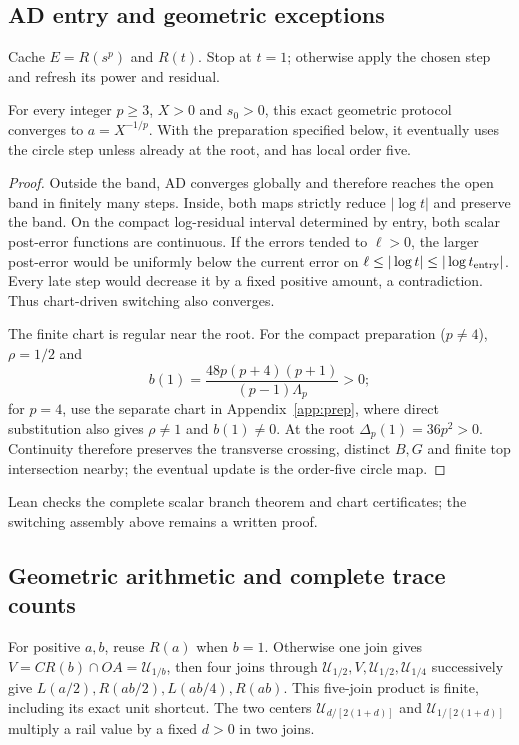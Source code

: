 \documentclass[11pt,a4paper]{article}
\newcommand{\hub}[1]{\mathcal U_{#1}}
\begin{document}
\subsection{AD entry and geometric exceptions}
Cache $E=R(s^p)$ and $R(t)$. Stop at $t=1$; otherwise apply the chosen step and refresh its power and residual.

\begin{proposition}\label{thm:entry}
For every integer $p\ge3$, $X>0$ and $s_0>0$, this exact geometric protocol converges to $a=X^{-1/p}$. With the preparation specified below, it eventually uses the circle step unless already at the root, and has local order five.
\end{proposition}
\begin{proof}
Outside the band, AD converges globally and therefore reaches the open band in finitely many steps. Inside, both maps strictly reduce $|\log t|$ and preserve the band. On the compact log-residual interval determined by entry, both scalar post-error functions are continuous. If the errors tended to $\ell>0$, the larger post-error would be uniformly below the current error on $\ell\le|\log t|\le|\log t_{\rm entry}|$. Every late step would decrease it by a fixed positive amount, a contradiction. Thus chart-driven switching also converges.

The finite chart is regular near the root. For the compact preparation ($p\ne4$), $\rho=1/2$ and
\[
 b(1)=\frac{48p(p+4)(p+1)}{(p-1)\Lambda_p}>0;
\]
for $p=4$, use the separate chart in Appendix~\ref{app:prep}, where direct substitution also gives $\rho\ne1$ and $b(1)\ne0$. At the root $\Delta_p(1)=36p^2>0$. Continuity therefore preserves the transverse crossing, distinct $B,G$ and finite top intersection nearby; the eventual update is the order-five circle map.
\end{proof}
Lean checks the complete scalar branch theorem and chart certificates; the switching assembly above remains a written proof.

\subsection{Geometric arithmetic and complete trace counts}
For positive $a,b$, reuse $R(a)$ when $b=1$. Otherwise one join gives $V=CR(b)\cap OA=\hub{1/b}$, then four joins through $\hub{1/2},V,\hub{1/2},\hub{1/4}$ successively give $L(a/2),R(ab/2),L(ab/4),R(ab)$. This five-join product is finite, including its exact unit shortcut. The two centers $\hub{d/[2(1+d)]}$ and $\hub{1/[2(1+d)]}$ multiply a rail value by a fixed $d>0$ in two joins.
\end{document}
